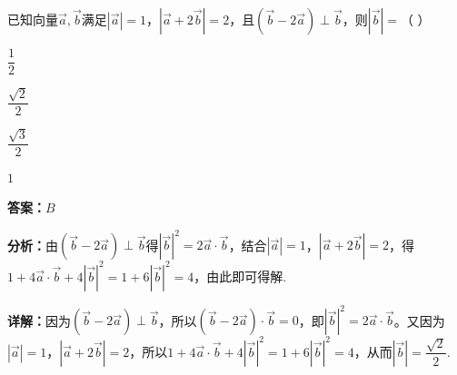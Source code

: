 \begin{question}[points=5]
已知向量$\vec{a}, \vec{b}$满足$|\vec{a}|=1$，$|\vec{a}+2\vec{b}|=2$，且$(\vec{b}-2\vec{a}) \perp \vec{b}$，则$|\vec{b}|=$（ ）
\begin{choices}
  \item $\dfrac{1}{2}$
  \item $\dfrac{\sqrt{2}}{2}$
  \item $\dfrac{\sqrt{3}}{2}$
  \item $1$
\end{choices}
\begin{solution}
\textbf{答案：}$B$

\textbf{分析：}由$(\vec{b}-2\vec{a})\perp\vec{b}$得$|\vec{b}|^2=2\vec{a}\cdot\vec{b}$，结合$|\vec{a}|=1$，$|\vec{a}+2\vec{b}|=2$，得$1+4\vec{a}\cdot\vec{b}+4|\vec{b}|^2=1+6|\vec{b}|^2=4$，由此即可得解.

\textbf{详解：}因为$(\vec{b}-2\vec{a})\perp\vec{b}$，所以$(\vec{b}-2\vec{a})\cdot\vec{b}=0$，即$|\vec{b}|^2=2\vec{a}\cdot\vec{b}$。又因为$|\vec{a}|=1$，$|\vec{a}+2\vec{b}|=2$，所以$1+4\vec{a}\cdot\vec{b}+4|\vec{b}|^2=1+6|\vec{b}|^2=4$，从而$|\vec{b}|=\dfrac{\sqrt{2}}{2}$.
\end{solution}
\end{question}

